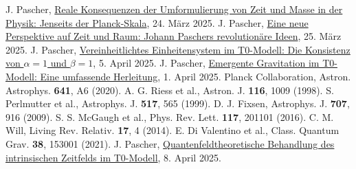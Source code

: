 \documentclass[12pt,a4paper]{article}
\begin{document}
\begin{thebibliography}{99}
		 J. Pascher, \href{https://github.com/jpascher/T0-Time-Mass-Duality/tree/main/2/pdf/Deutsch/Jenseits der Planck-Skala.pdf}{Reale Konsequenzen der Umformulierung von Zeit und Masse in der Physik: Jenseits der Planck-Skala}, 24. März 2025.
		 J. Pascher, \href{https://github.com/jpascher/T0-Time-Mass-Duality/tree/main/2/pdf/Deutsch/Eine neue Perspektive auf Zeit und Raum Johann Paschers revolutionäre Ideen.pdf}{Eine neue Perspektive auf Zeit und Raum: Johann Paschers revolutionäre Ideen}, 25. März 2025.
		 J. Pascher, \href{https://github.com/jpascher/T0-Time-Mass-Duality/tree/main/2/pdf/Deutsch/Die Konsistenz von alpha = 1 und beta = 1.pdf}{Vereinheitlichtes Einheitensystem im T0-Modell: Die Konsistenz von \(\alpha = 1\) und \(\beta = 1\)}, 5. April 2025.
		 J. Pascher, \href{https://github.com/jpascher/T0-Time-Mass-Duality/tree/main/2/pdf/Deutsch/Emergente Gravitation im T0-Modell Eine formale Herleitung.pdf}{Emergente Gravitation im T0-Modell: Eine umfassende Herleitung}, 1. April 2025.
		 Planck Collaboration, Astron. Astrophys. \textbf{641}, A6 (2020).
		 A. G. Riess et al., Astron. J. \textbf{116}, 1009 (1998).
		 S. Perlmutter et al., Astrophys. J. \textbf{517}, 565 (1999).
		 D. J. Fixsen, Astrophys. J. \textbf{707}, 916 (2009).
		 S. S. McGaugh et al., Phys. Rev. Lett. \textbf{117}, 201101 (2016).
		 C. M. Will, Living Rev. Relativ. \textbf{17}, 4 (2014).
		 E. Di Valentino et al., Class. Quantum Grav. \textbf{38}, 153001 (2021).
		 J. Pascher, \href{https://github.com/jpascher/T0-Time-Mass-Duality/tree/main/2/pdf/Deutsch/Quantenfeldtheoretische Behandlung des intrinsischen Zeitfelds im T0-Modell.pdf}{Quantenfeldtheoretische Behandlung des intrinsischen Zeitfelds im T0-Modell}, 8. April 2025.
	\end{thebibliography}
	
\end{document}
